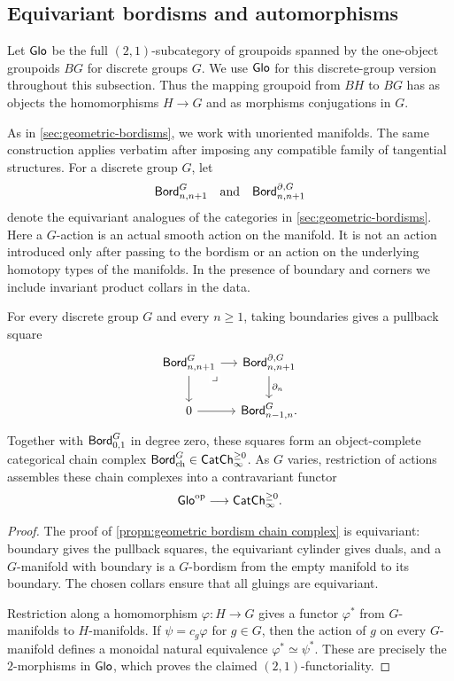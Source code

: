 \documentclass[a4paper,11pt]{article}
\begin{document}
\subsection{Equivariant bordisms and automorphisms}
\label{sec:equivariant-bordisms}

Let $\textup{\textsf{Glo}}$ be the full $(2,1)$-subcategory of groupoids spanned by the
one-object groupoids $BG$ for discrete groups $G$.  We use $\textup{\textsf{Glo}}$ for
this discrete-group version throughout this subsection.  Thus
the mapping groupoid from $BH$ to $BG$ has as objects the homomorphisms
$H\to G$ and as morphisms conjugations in $G$.

As in \cref{sec:geometric-bordisms}, we work with unoriented
manifolds. The same construction applies verbatim after imposing any
compatible family of tangential structures. For a discrete group $G$, let
\[
  \textup{\textsf{Bord}}^G_{n,n+1}
  \quad\text{and}\quad
  \textup{\textsf{Bord}}^{\partial,G}_{n,n+1}
\]
denote the equivariant analogues of the categories in
\cref{sec:geometric-bordisms}. Here a $G$-action is an actual smooth
action on the manifold. It is not an action introduced only after passing
to the bordism \icat{} or an action on the underlying homotopy types of
the manifolds. In the presence of boundary and corners we include
invariant product collars in the data.

\begin{propn}\label{propn:equivariant bordism functoriality}
  For every discrete group $G$ and every $n\geq1$, taking boundaries
  gives a pullback square
  \[
    \begin{tikzcd}[column sep=small]
      \Bord^G_{n,n+1}
        \drpullback \ar[r] \ar[d]
        & \Bord^{\partial,G}_{n,n+1}
          \ar[d,"\partial_n"] \\
      0 \ar[r]
        & \Bord^G_{n-1,n}.
    \end{tikzcd}
  \]
  Together with $\textup{\textsf{Bord}}^G_{0,1}$ in degree zero, these squares
  form an object-complete categorical chain complex
  $\textup{\textsf{Bord}}_{\mathrm{ch}}^G\in\textup{\textsf{CatCh}}^{\geq 0}_{\infty}$.  As $G$ varies,
  restriction of actions assembles these chain complexes into a
  contravariant functor
  \[
    \textup{\textsf{Glo}}^{\text{\textup{op}}}\longrightarrow\textup{\textsf{CatCh}}^{\geq 0}_{\infty}.
  \]
\end{propn}

\begin{proof}
  The proof of \cref{propn:geometric bordism chain complex} is
  equivariant: boundary gives the pullback squares, the equivariant
  cylinder gives duals, and a $G$-manifold with boundary is a
  $G$-bordism from the empty manifold to its boundary.  The chosen
  collars ensure that all gluings are equivariant.

  Restriction along a homomorphism $\varphi\colon H\to G$ gives a
  functor $\varphi^*$ from $G$-manifolds to $H$-manifolds.  If
  $\psi=c_g\varphi$ for $g\in G$, then the action of $g$ on every
  $G$-manifold defines a monoidal natural equivalence
  $\varphi^*\simeq\psi^*$.  These are precisely the $2$-morphisms in
  $\textup{\textsf{Glo}}$, which proves the claimed $(2,1)$-functoriality.
\end{proof}
\end{document}
